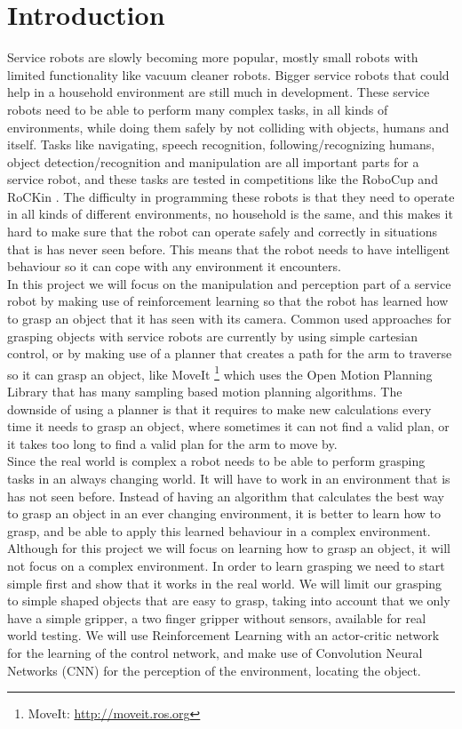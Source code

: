 \section{Introduction}
Service robots are slowly becoming more popular, mostly small robots with limited functionality like vacuum cleaner robots. Bigger service robots that could help in a household environment are still much in development. 
These service robots need to be able to perform many complex tasks, in all kinds of environments, while doing them safely by not colliding with objects, humans and itself.   
Tasks like navigating, speech recognition, following/recognizing humans, object detection/recognition and manipulation are all important parts for a service robot, 
and these tasks are tested in competitions like the RoboCup \cite{robocup} and RoCKin \cite{rockin}. The difficulty in programming these robots is that they need to operate in all kinds of different environments, no household is the same, 
and this makes it hard to make sure that the robot can operate safely and correctly in situations that is has never seen before. This means that the robot needs to have intelligent behaviour so it can cope with any environment it encounters. \\
In this project we will focus on the manipulation and perception part of a service robot by making use of reinforcement learning so that the robot has learned how to grasp an object that it has seen with its camera.  
Common used approaches for grasping objects with service robots are currently by using simple cartesian control, or by making use of a planner that creates a path for the arm to traverse so it can grasp an object, 
like MoveIt \footnote{MoveIt: \url{http://moveit.ros.org}} which uses the Open Motion Planning Library \cite{ompl} that has many sampling based motion planning algorithms. 
The downside of using a planner is that it requires to make new calculations every time it needs to grasp an object, where sometimes it can not find a valid plan, or it takes too long to find a valid plan
for the arm to move by. \\
Since the real world is complex a robot needs to be able to perform grasping tasks in an always changing world. It will have to work in an environment that is has not seen before. Instead of having an algorithm that calculates
the best way to grasp an object in an ever changing environment, it is better to learn how to grasp, and be able to apply this learned behaviour in a complex environment. Although for this project we will focus on learning 
how to grasp an object, it will not focus on a complex environment. In order to learn grasping we need to start simple first and show that it works in the real world. We will limit our grasping to simple shaped objects 
that are easy to grasp, taking into account that we only have a simple gripper, a two finger gripper without sensors, available for real world testing. We will use Reinforcement Learning with an actor-critic network for the learning 
of the control network, and make use of Convolution Neural Networks (CNN) \cite{cnn} for the perception of the environment, locating the object. 


